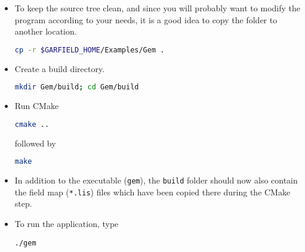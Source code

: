 \begin{itemize}
  \item
  To keep the source tree clean, and since you will probably want to modify 
  the program according to your needs, it is a good idea to copy 
  the folder to another location.
\begin{lstlisting}[language=bash]
cp -r $GARFIELD_HOME/Examples/Gem .
\end{lstlisting} 
  \item
  Create a build directory.
\begin{lstlisting}[language=bash]
mkdir Gem/build; cd Gem/build
\end{lstlisting} 
  \item
  Run CMake
\begin{lstlisting}[language=bash]
cmake ..
\end{lstlisting} 
  followed by
\begin{lstlisting}[language=bash]
make
\end{lstlisting}
  \item
  In addition to the executable (\texttt{gem}), the \texttt{build} 
  folder should now also contain the field map (\texttt{*.lis}) 
  files which have been copied there during the CMake step.
  \item
  To run the application, type
\begin{lstlisting}
./gem
\end{lstlisting}
\end{itemize}
%
%

